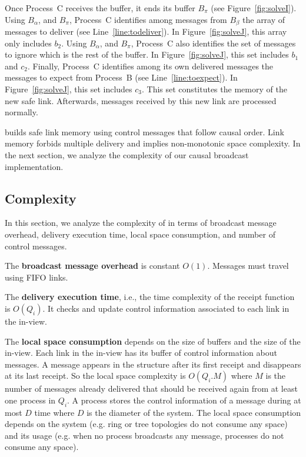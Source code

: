\noindent Once Process~C receives the buffer, it ends its buffer $B_\pi$ (see
Figure~\ref{fig:solveI}). Using $B_\alpha$, and $B_\pi$, Process~C identifies
among messages from $B_\beta$ the array of messages to deliver (see
Line~\ref{line:todeliver}). In Figure~\ref{fig:solveJ}, this array only includes
$b_2$.  Using $B_\alpha$, and $B_\pi$, Process~C also identifies the set of
messages to ignore which is the rest of the buffer. In Figure~\ref{fig:solveJ},
this set includes $b_1$ and $c_2$. Finally, Process~C identifies among its own
delivered messages the messages to expect from Process~B (see
Line~\ref{line:toexpect}). In Figure~\ref{fig:solveJ}, this set includes $c_3$.
This set constitutes the memory of the new safe link.  Afterwards, messages
received by this new link are processed normally.


\RPCBROADCAST builds safe link memory using control messages that follow causal
order. Link memory forbids multiple delivery and implies non-monotonic space
complexity. In the next section, we analyze the complexity of our causal
broadcast implementation.

\subsection{Complexity}
\label{subsec:complexity}

In this section, we analyze the complexity of \RPCBROADCAST in terms of
broadcast message overhead, delivery execution time, local space consumption,
and number of control messages.

\noindent The \textbf{broadcast message overhead} is constant $O(1)$. Messages
must travel using FIFO links.

\noindent The \textbf{delivery execution time}, i.e., the time complexity of the
receipt function is $O(Q_i)$. It checks and update control information
associated to each link in the in-view.

\noindent The \textbf{local space consumption} depends on the size of buffers
and the size of the in-view. Each link in the in-view has its buffer of control
information about messages. A message appears in the structure after its first
receipt and disappears at its last receipt. So the local space complexity is
$O(Q_i.M)$ where $M$ is the number of messages already delivered that should be
received again from at least one process in $Q_i$. A process stores the control
information of a message during at most $D$ time where $D$ is the diameter of
the system. The local space consumption depends on the system (e.g. ring or tree
topologies do not consume any space) and its usage (e.g. when no process
broadcasts any message, processes do not consume any space).

